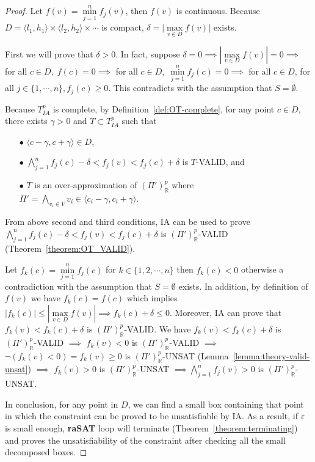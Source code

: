 \begin{proof}
\sloppy
Let $f(v) = \min\limits_{j = 1}^nf_j(v)$, then $f(v)$ is continuous. Because $D = \langle l_1, h_1 \rangle \times \langle l_2, h_2 \rangle \times \cdots$ is compact, ${\delta = |\max\limits_{v \in D}f(v)}|$ exists. 

First we will prove that $\delta > 0$. In fact, suppose $\delta = 0 \implies |\max\limits_{v \in D}f(v)| = 0 \implies$ for all $c \in D, \; f(c) = 0 \implies$ for all $c \in D, \; \min\limits_{j = 1}^nf_j(c) = 0 \implies$ for all $c \in D$, for all $j \in \{1, \cdots, n\}, f_j(c) \ge 0$. This contradicts with the assumption that $S = \emptyset$.

Because $T^p_{IA}$ is complete, by Definition~\ref{def:OT-complete}, for any point $c \in D$, there exists $\gamma > 0$ and $T \subset T^p_{IA}$ such that 
\begin{itemize}
\item[$\bullet$] $\langle c - \gamma, c + \gamma \rangle \in D$,
\item[$\bullet$] $\bigwedge\limits_{j = 1}^n f_j(c) - \delta < f_j(v) < f_j(c) + \delta$ is $T$-VALID, and
\item[$\bullet$] $T$ is an over-approximation of $(\Pi')^p_\mathbb{R}$ where $\Pi' = \bigwedge\limits_{v_i \in V}v_i \in \langle c_i - \gamma, c_i + \gamma \rangle$.
\end{itemize} 
From above second and third conditions, IA can be used to prove $\bigwedge\limits_{j = 1}^n f_j(c) - \delta < f_j(v) < f_j(c) + \delta$ is $(\Pi')^p_\mathbb{R}$-VALID (Theorem~\ref{theorem:OT_VALID}).

Let $f_k(c) = \min\limits_{j=1}^nf_j(c)$ for $k \in \{1, 2, \cdots, n\}$ then $f_k(c) < 0$ otherwise a contradiction with the assumption that $S = \emptyset$ exists. In addition, by definition of $f(v)$ we have $f_k(c) = f(c)$ which implies $|f_k(c)| \le |\max\limits_{v \in D}f(v)| \implies f_k(c) + \delta \le 0$. Moreover, IA can prove that $f_k(v) < f_k(c) + \delta$ is $(\Pi')^p_\mathbb{R}$-VALID. We have $f_k(v) < f_k(c) + \delta$ is $(\Pi')^p_\mathbb{R}$-VALID $\implies$ $f_k(v) < 0$ is $(\Pi')^p_\mathbb{R}$-VALID $\implies$ $\neg(f_k(v) < 0) = f_k(v) \ge 0$ is $(\Pi')^p_\mathbb{R}$-UNSAT (Lemma~\ref{lemma:theory-valid-unsat}) $\implies$ $f_k(v) > 0$ is $(\Pi')^p_\mathbb{R}$-UNSAT  $\implies \bigwedge\limits_{j = 1}^n f_j(v) > 0$ is $(\Pi')^p_\mathbb{R}$-UNSAT. 

In conclusion, for any point in $D$, we can find a small box containing that point in which the constraint can be proved to be unsatisfiable by IA. As a result, if $\varepsilon$ is small enough, \textbf{raSAT} loop will terminate (Theorem~\ref{theorem:terminating}) and proves the unsatisfiability of the constraint after checking all the small decomposed boxes.
\end{proof}


